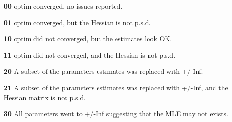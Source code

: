 \documentclass[review]{elsarticle}
\begin{document}
\begin{itemize}
\item[\textbf{00}] optim converged, no issues reported.
\item[\textbf{01}] optim converged, but the Hessian is not p.s.d.
\item[\textbf{10}] optim did not converged, but the estimates look OK.
\item[\textbf{11}] optim did not converged, and the Hessian is not p.s.d.
\item[\textbf{20}] A subset of the parameters estimates was replaced with +/-Inf.
\item[\textbf{21}] A subset of the parameters estimates was replaced with +/-Inf, and the Hessian matrix is not p.s.d.
\item[\textbf{30}] All parameters went to +/-Inf suggesting that the MLE may not exists.
\end{itemize}
\end{document}
